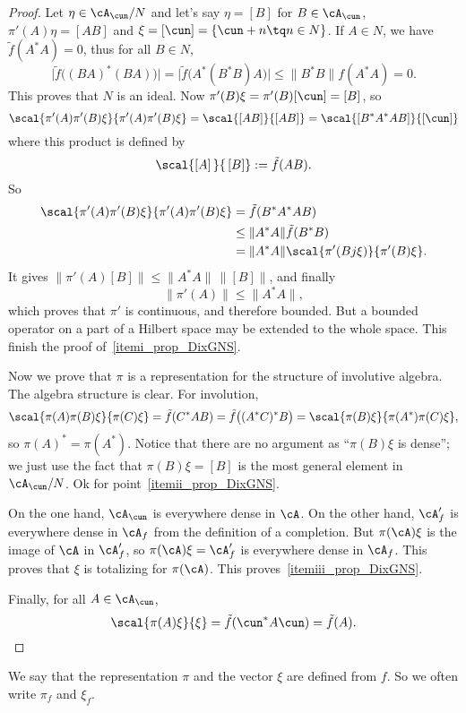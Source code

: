 \begin{proof}

	Let $\eta\in\cA_{\cun}/N$ and let's say $\eta=[B]$ for $B\in\cA_{\cun}$, $\pi'(A)\eta=[AB]$ and $\xi=[\cun]=\{ \cun+n\tq n\in N \}$. If $A\in N$, we have $\tilde f(A^*A)=0$, thus for all $B\in N$,
	\[
	  \big|  \tilde f\big( (BA)^*(BA) \big)   \big|=\big| \tilde f\big( A^*(B^*B)A \big) \big| \leq \| B^*B \|f(A^*A)=0.
	\]
	This proves that $N$ is an ideal. Now $\pi'(B)\xi=\pi'(B)[\cun]=[B]$, so
	\[
	\scal{ \pi'(A)\pi'(B)\xi }{ \pi'(A)\pi'(B)\xi }=\scal{ [AB] }{ [AB] }
			=\scal{ [B^*A^*AB] }{ [\cun] }
	\]
	where this product is defined by
	\begin{equation}
	  \scal{ [A]\, }{\, [B] }:=\tilde f(AB).
	\end{equation}
	So
	\[
	 \begin{split}
	 \scal{ \pi'(A)\pi'(B)\xi }{ \pi'(A)\pi'(B)\xi }&=\tilde f(B^*A^*AB)\\
			&\leq \| A^*A \|\tilde f(B^*B) \\
			&=\| A^*A \|\scal{ \pi'(Bj\xi) }{ \pi'(B)\xi }.
	\end{split}
	\]
	It gives $\| \pi'(A)[B] \|\leq\| A^*A \|\,\| [B] \|$, and finally
	\begin{equation}
	  \| \pi'(A) \|\leq\| A^*A \|,
	\end{equation}
	which proves that $\pi'$ is continuous, and therefore bounded. But a bounded operator on a part of a Hilbert space may be extended to the whole space. This finish the proof of~\ref{itemi_prop_DixGNS}.

	Now we prove that $\pi$ is a representation for the structure of involutive algebra. The algebra structure is clear. For involution,
	\[
	\scal{ \pi(A)\pi(B)\xi }{ \pi(C)\xi }	=\tilde f(C^*AB)
						=\tilde f\big( (A^*C)^*B \big)
						=\scal{ \pi(B)\xi }{ \pi(A^*)\pi(C)\xi },
	\]
	so $\pi(A)^*=\pi(A^*)$. Notice that there are no argument as ``$\pi(B)\xi$ is dense''; we just use the fact that $\pi(B)\xi=[B]$ is the most general element in $\cA_{\cun}/N$. Ok for point~\ref{itemii_prop_DixGNS}.

	On the one hand, $\cA_{\cun}$ is everywhere dense in $\cA$. On the other hand, $\cA'_f$ is everywhere dense in $\cA_f$ from the definition of a completion. But $\pi(\cA)\xi$ is the image of $\cA$ in $\cA'_f$, so $\pi(\cA)\xi=\cA'_f$ is everywhere dense in $\cA_f$. This proves that $\xi$ is totalizing for $\pi(\cA)$.  This proves~\ref{itemiii_prop_DixGNS}.

	Finally, for all $A\in\cA_{\cun}$,
	\[
	  \scal{ \pi(A)\xi }{ \xi }=\tilde f(\cun^*A\cun)=\tilde f(A).
	\]

\end{proof}
We say that the representation $\pi$ and the vector $\xi$ are defined from $f$. So we often write $\pi_f$ and $\xi_f$.

